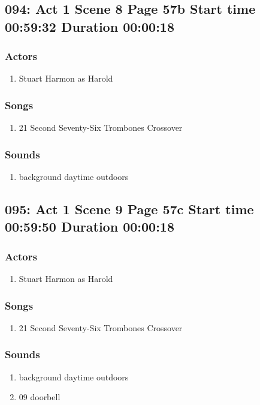 \subsection{094: Act 1 Scene 8 Page 57b Start time 00:59:32 Duration 00:00:18}

\subsubsection{Actors}
\begin{enumerate}
\item Stuart Harmon as Harold
\end{enumerate}

\subsubsection{Songs}
\begin{enumerate}
\item 21 Second Seventy-Six Trombones Crossover
\end{enumerate}\subsubsection{Sounds}
\begin{enumerate}
\item background daytime outdoors
\end{enumerate}
\subsection{095: Act 1 Scene 9 Page 57c Start time 00:59:50 Duration 00:00:18}

\subsubsection{Actors}
\begin{enumerate}
\item Stuart Harmon as Harold
\end{enumerate}

\subsubsection{Songs}
\begin{enumerate}
\item 21 Second Seventy-Six Trombones Crossover
\end{enumerate}\subsubsection{Sounds}
\begin{enumerate}
\item background daytime outdoors
\item 09 doorbell
\end{enumerate}
